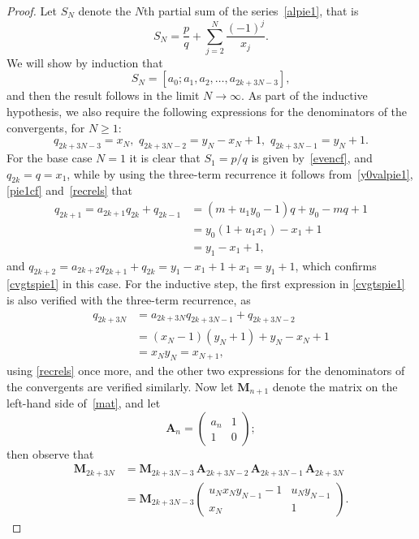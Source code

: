 \documentclass[10pt, a4paper]{amsart}
\numberwithin{equation}{section}
\theoremstyle{plain}
\theoremstyle{definition}
\begin{document}
\begin{proof} 
Let $S_N$ denote the $N$th partial sum of the series~\eqref{alpie1}, that is
\[ 
S_N= \frac{p}{q}+\sum_{j=2}^N \frac{(-1)^j}{x_j}. 
\]
We will show by induction that 
\[ 
S_N=[a_0; a_1, a_2,\ldots, a_{2k+3N-3}],
\]
and then the result follows in the limit $N\to\infty$. 
As part of the inductive hypothesis, we also require 
the following expressions for the denominators 
of the convergents, for $N\geq 1$: 
\begin{equation}
\label{cvgtspie1} 
q_{2k+3N-3}=x_{N}, \,\, q_{2k+3N-2}=y_N-x_N+1, 
\,\,  q_{2k+3N-1}=y_N+1 . 
\end{equation}   
For the base case $N=1$ it is clear that 
$S_1=p/q$ is given by~\eqref{evencf}, and 
$q_{2k}=q=x_1$, while by using the three-term recurrence 
it follows from~\eqref{y0valpie1}, \eqref{pie1cf} 
and~\eqref{recrels} that 
\begin{align*} 
q_{2k+1} = a_{2k+1}q_{2k}+ q_{2k-1}
&= (m+u_1 y_0-1)q +y_0 -mq+1 \\ 
&= y_0(1+u_1x_1) -x_1+1  \\
&= y_1-x_1+1,
\end{align*} 
and 
$q_{2k+2}=a_{2k+2}q_{2k+1}+q_{2k} =y_1-x_1+1+x_1=y_1+1$, 
which confirms \eqref{cvgtspie1} in this case. For the inductive step, 
the first expression in \eqref{cvgtspie1} 
is also verified with the three-term recurrence,  as 
\begin{align*}
q_{2k+3N} &= a_{2k+3N} q_{2k+3N-1}+q_{2k+3N-2}\\
&= (x_N-1)(y_N+1)+y_N-x_N+1\\ 
&= x_Ny_N=x_{N+1}, 
\end{align*}
using \eqref{recrels} once more, 
and the other two expressions for the denominators of the 
convergents are verified similarly. 
Now let $\mathbf{M}_{n+1}$ denote the matrix on the left-hand 
side of~\eqref{mat}, and let 
\[ 
\mathbf{A}_n = \begin{pmatrix} a_n & 1 \\ 1 & 0 \end{pmatrix}; 
\] 
then observe that
\begin{align*}
\mathbf{M}_{2k+3N} 
&= \mathbf{M}_{2k+3N-3} \, \mathbf{A}_{2k+3N-2} \,
\mathbf{A}_{2k+3N-1} \, \mathbf{A}_{2k+3N}  \\
&= \mathbf{M}_{2k+3N-3} 
\begin{pmatrix} u_N x_N y_{N-1}-1 & u_N y_{N-1} \\ x_N & 1 \end{pmatrix}.
\end{align*} 

\end{proof}
\end{document}
